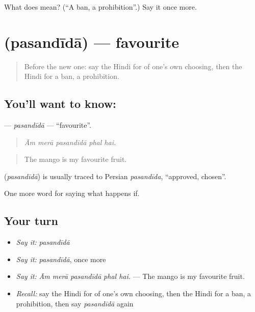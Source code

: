 \begin{tcolorbox}[breakable,colback=teal!4,colframe=teal!35!black,title={Before you move on}]
What does  mean? (\textquotedblleft{}A ban, a prohibition\textquotedblright{}.) Say it once more.
\end{tcolorbox}
\section[\texorpdfstring{\hi{पसंदीदा} (pasandīdā)}{पसंदीदा (pasandīdā)}]{ (pasandīdā) — favourite}

\label{lesson:HI-C550-pasandida}



\begin{quote}
Before the new one: say the Hindi for of one's own choosing, then the Hindi for a ban, a prohibition.
\end{quote}

\subsection*{You'll want to know: }
\textbf{} — \emph{pasandīdā} — \textquotedblleft{}favourite\textquotedblright{}.

\begin{quote}
    
\end{quote}

\begin{quote}
\emph{Ām merā pasandīdā phal hai.}
\end{quote}

\begin{quote}
The mango is my favourite fruit.
\end{quote}

\begin{cousinweb}
\textbf{} (\emph{pasandīdā}) is usually traced to Persian \emph{pasandīda}, \textquotedblleft{}approved, chosen\textquotedblright{}.
\end{cousinweb}

\begin{grammarlens}[title={What you've built}]
One more word for saying what happens if.
\end{grammarlens}

\subsection*{Your turn}
\begin{itemize}
\raggedright
  \item \emph{Say it:} \emph{pasandīdā}
  \item \emph{Say it:} \emph{pasandīdā}, once more
  \item \emph{Say it:} \emph{Ām merā pasandīdā phal hai.} — The mango is my favourite fruit.
  \item \emph{Recall:} say the Hindi for of one's own choosing, then the Hindi for a ban, a prohibition, then say \emph{pasandīdā} again
\end{itemize}

